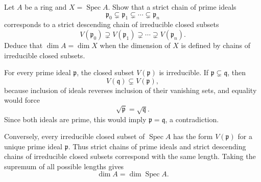 \begin{problem}\label{prob:vi29-18}
Let \(A\) be a ring and \(X=\operatorname{Spec}A\). Show that a strict chain of prime ideals
\[
\mathfrak p_0\subsetneq\mathfrak p_1\subsetneq\cdots\subsetneq\mathfrak p_n
\]
corresponds to a strict descending chain of irreducible closed subsets
\[
V(\mathfrak p_0)\supsetneq V(\mathfrak p_1)\supsetneq\cdots\supsetneq V(\mathfrak p_n).
\]
Deduce that \(\dim A=\dim X\) when the dimension of \(X\) is defined by chains of irreducible closed subsets.
\end{problem}

\ifdefined\FullProblemDossiers
\begin{solution}
For every prime ideal \(\mathfrak p\), the closed subset \(V(\mathfrak p)\) is irreducible.
If \(\mathfrak p\subsetneq\mathfrak q\), then
\[
V(\mathfrak q)\subsetneq V(\mathfrak p),
\]
because inclusion of ideals reverses inclusion of their vanishing sets, and equality would force
\[
\sqrt{\mathfrak p}=\sqrt{\mathfrak q}.
\]
Since both ideals are prime, this would imply \(\mathfrak p=\mathfrak q\), a contradiction.

Conversely, every irreducible closed subset of \(\operatorname{Spec}A\) has the form
\(V(\mathfrak p)\) for a unique prime ideal \(\mathfrak p\). Thus strict chains of prime ideals and
strict descending chains of irreducible closed subsets correspond with the same length. Taking the
supremum of all possible lengths gives
\[
\boxed{\dim A=\dim \operatorname{Spec}A}.
\]
\end{solution}
\fi
